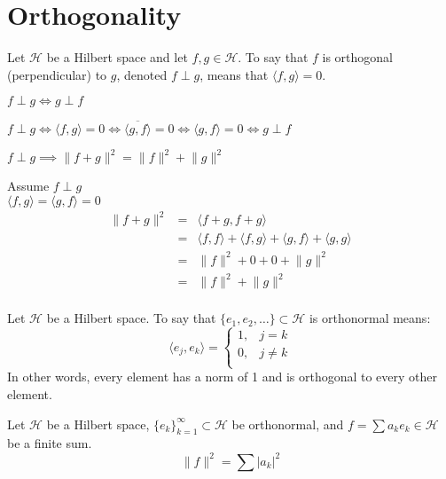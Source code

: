 \documentclass[letterpaper,12pt,fleqn]{article}
\newcommand{\abs}[1]{\left|#1\right|}
\newcommand{\norm}[1]{\lVert#1\rVert}
\newcommand{\inner}[2]{\langle#1,#2\rangle}
\newcommand{\Conj}[1]{\overline{#1}}
\newcommand{\hilb}{\mathcal{H}}
\begin{document}
\section*{Orthogonality}

\begin{definition}
Let $\hilb$ be a Hilbert space and let $f,g\in\hilb$. To say that $f$ is
orthogonal (perpendicular) to $g$, denoted $f\perp g$, means that
$\inner{f}{g}=0$.
\end{definition}

\begin{lemma}
$f\perp g\iff g\perp f$
\end{lemma}

\begin{theproof}
$f\perp g\iff\inner{f}{g}=0\iff\Conj{\inner{g}{f}}=0\iff\inner{g}{f}=0\iff
    g\perp f$
\end{theproof}

\begin{theorem}
$f\perp g\implies\norm{f+g}^2=\norm{f}^2+\norm{g}^2$
\end{theorem}

\begin{theproof}
Assume $f\perp g$ \\
$\inner{f}{g}=\inner{g}{f}=0$ \\
\begin{eqnarray*}
\norm{f+g}^2 &=& \inner{f+g}{f+g} \\
    &=& \inner{f}{f}+\inner{f}{g}+\inner{g}{f}+\inner{g}{g} \\
    &=& \norm{f}^2+0+0+\norm{g}^2 \\
    &=& \norm{f}^2+\norm{g}^2 \\
\end{eqnarray*}
\end{theproof}

\begin{definition}
Let $\hilb$ be a Hilbert space. To say that $\{e_1,e_2,\ldots\}\subset\hilb$ is
orthonormal means:
\[\inner{e_j}{e_k}=\begin{cases}
1, & j=k \\
0, & j\ne k \\
\end{cases}\]
In other words, every element has a norm of 1 and is orthogonal to every other
element.
\end{definition}

\begin{theorem}
Let $\hilb$ be a Hilbert space, $\{e_k\}_{k=1}^{\infty}\subset\hilb$ be
orthonormal, and $f=\sum a_ke_k\in\hilb$ be a finite sum.
\[\norm{f}^2=\sum\abs{a_k}^2\]
\end{theorem}
\end{document}
